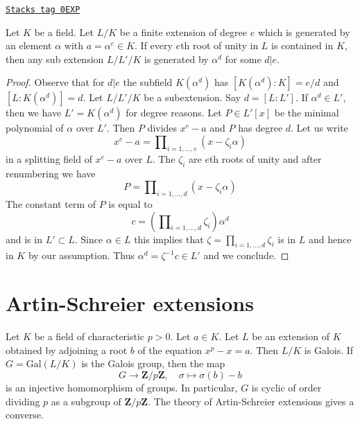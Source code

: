 \begin{lemma}
\label{fields-lemma-subfields-kummer}
\href{https://stacks.math.columbia.edu/tag/0EXP}{\texttt{Stacks tag 0EXP}}

\begin{reference}
\cite[Theorem 5.2]{Radical}
\end{reference}
Let $K$ be a field. Let $L/K$ be a finite extension of degree $e$
which is generated by an element $\alpha$ with $a = \alpha^e \in K$.
If every $e$th root of unity in $L$ is contained in $K$, then
any sub extension $L/L'/K$ is generated by $\alpha^d$ for some $d | e$.
\end{lemma}

\begin{proof}
Observe that for $d | e$ the subfield $K(\alpha^d)$ has
$[K(\alpha^d) : K] = e/d$ and $[L : K(\alpha^d)] = d$.
Let $L/L'/K$ be a subextension. Say $d = [L : L']$. If $\alpha^d \in L'$,
then we have $L' = K(\alpha^d)$ for degree reasons.
Let $P \in L'[x]$ be the minimal polynomial of $\alpha$ over $L'$.
Then $P$ divides $x^e - a$ and $P$ has degree $d$.
Let us write
$$
x^e - a = \prod\nolimits_{i = 1, \ldots, e} (x - \zeta_i \alpha)
$$
in a splitting field of $x^e - a$ over $L$. The $\zeta_i$ are $e$th roots
of unity and after renumbering we have
$$
P = \prod\nolimits_{i = 1, \ldots, d} (x - \zeta_i \alpha)
$$
The constant term of $P$ is equal to
$$
c = (\prod\nolimits_{i = 1, \ldots, d} \zeta_i) \alpha^d
$$
and is in $L' \subset L$. Since $\alpha \in L$ this implies that
$\zeta = \prod_{i = 1, \ldots, d} \zeta_i$ is in $L$ and hence in $K$ by
our assumption. Thus $\alpha^d = \zeta^{-1}c \in L'$ and we conclude.
\end{proof}

\section{Artin-Schreier extensions}
\label{fields-section-Artin-Schreier}
Let $K$ be a field of characteristic $p > 0$. Let $a \in K$. Let $L$ be an
extension of $K$ obtained by adjoining a root $b$ of the equation
$x^p - x = a$. Then $L/K$ is Galois. If $G = \text{Gal}(L/K)$ is the Galois
group, then the map
$$
G \longrightarrow \mathbf{Z}/p\mathbf{Z},\quad
\sigma \longmapsto \sigma(b) - b
$$
is an injective homomorphism of groups. In particular, $G$ is cyclic
of order dividing $p$ as a subgroup of $\mathbf{Z}/p\mathbf{Z}$.
The theory of Artin-Schreier extensions gives a converse.

